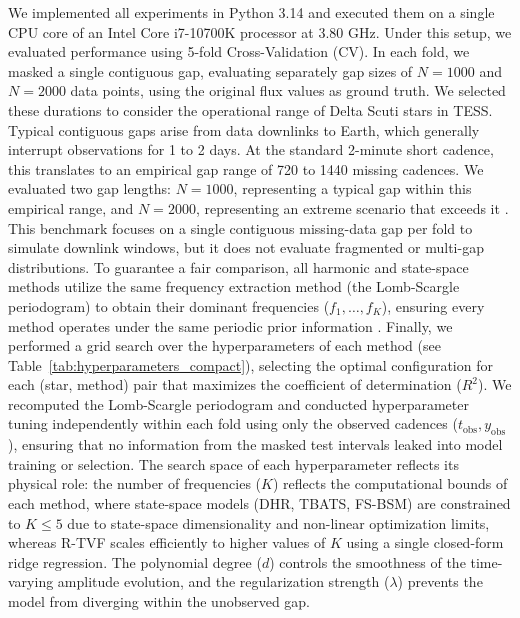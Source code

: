 \documentclass[a4paper,fleqn]{cas-sc}
\begin{document}
We implemented all experiments in Python 3.14 and executed them on a single CPU core of an Intel Core i7-10700K processor at 3.80 GHz. Under this setup, we evaluated performance using 5-fold Cross-Validation (CV). In each fold, we masked a single contiguous gap, evaluating separately gap sizes of $N=1000$ and $N=2000$ data points, using the original flux values as ground truth. We selected these durations to consider the operational range of Delta Scuti stars in TESS. Typical contiguous gaps arise from data downlinks to Earth, which generally interrupt observations for 1 to 2 days. At the standard 2-minute short cadence, this translates to an empirical gap range of 720 to 1440 missing cadences. We evaluated two gap lengths: $N=1000$, representing a typical gap within this empirical range, and $N=2000$, representing an extreme scenario that exceeds it \cite{GarciaHernandez2009HD174936, jenkins2021tess}. {\color{blue}This benchmark focuses on a single contiguous missing-data gap per fold to simulate downlink windows, but it does not evaluate fragmented or multi-gap distributions.} To guarantee a fair comparison, all harmonic and state-space methods utilize the same frequency extraction method (the Lomb-Scargle periodogram) to obtain their dominant frequencies ($f_1, \ldots, f_K$), ensuring every method operates under the same periodic prior information \cite{vanderplas2018understanding}. Finally, we performed a grid search over the hyperparameters of each method (see Table~\ref{tab:hyperparameters_compact}), selecting the optimal configuration for each (star, method) pair that maximizes the coefficient of determination ($R^2$). {\color{blue}We recomputed the Lomb-Scargle periodogram and conducted hyperparameter tuning independently within each fold using only the observed cadences ($t_{\text{obs}}, y_{\text{obs}}$), ensuring that no information from the masked test intervals leaked into model training or selection.} The search space of each hyperparameter reflects its physical role: {\color{blue}the number of frequencies ($K$) reflects the computational bounds of each method, where state-space models (DHR, TBATS, FS-BSM) are constrained to $K \le 5$ due to state-space dimensionality and non-linear optimization limits, whereas R-TVF scales efficiently to higher values of $K$ using a single closed-form ridge regression.} The polynomial degree ($d$) controls the smoothness of the time-varying amplitude evolution, and the regularization strength ($\lambda$) prevents the model from diverging within the unobserved gap.
\end{document}
